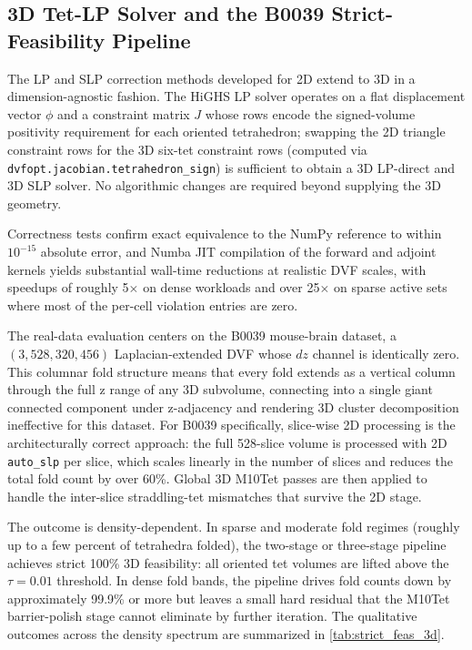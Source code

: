 \subsection{3D Tet-LP Solver and the B0039 Strict-Feasibility Pipeline}
\label{sec:3d_solver}

The LP and SLP correction methods developed for 2D extend to 3D in a dimension-agnostic fashion. The HiGHS LP solver operates on a flat displacement vector $\phi$ and a constraint matrix $J$ whose rows encode the signed-volume positivity requirement for each oriented tetrahedron; swapping the 2D triangle constraint rows for the 3D six-tet constraint rows (computed via \texttt{dvfopt.jacobian.tetrahedron\_sign}) is sufficient to obtain a 3D LP-direct and 3D SLP solver. No algorithmic changes are required beyond supplying the 3D geometry.

Correctness tests confirm exact equivalence to the NumPy reference to within $10^{-15}$ absolute error, and Numba JIT compilation of the forward and adjoint kernels yields substantial wall-time reductions at realistic DVF scales, with speedups of roughly 5$\times$ on dense workloads and over 25$\times$ on sparse active sets where most of the per-cell violation entries are zero.

The real-data evaluation centers on the B0039 mouse-brain dataset, a $(3, 528, 320, 456)$ Laplacian-extended DVF whose $dz$ channel is identically zero. This columnar fold structure means that every fold extends as a vertical column through the full z range of any 3D subvolume, connecting into a single giant connected component under z-adjacency and rendering 3D cluster decomposition ineffective for this dataset. For B0039 specifically, slice-wise 2D processing is the architecturally correct approach: the full 528-slice volume is processed with 2D \texttt{auto\_slp} per slice, which scales linearly in the number of slices and reduces the total fold count by over 60\%. Global 3D M10Tet passes are then applied to handle the inter-slice straddling-tet mismatches that survive the 2D stage.

The outcome is density-dependent. In sparse and moderate fold regimes (roughly up to a few percent of tetrahedra folded), the two-stage or three-stage pipeline achieves strict 100\% 3D feasibility: all oriented tet volumes are lifted above the $\tau = 0.01$ threshold. In dense fold bands, the pipeline drives fold counts down by approximately 99.9\% or more but leaves a small hard residual that the M10Tet barrier-polish stage cannot eliminate by further iteration. The qualitative outcomes across the density spectrum are summarized in \autoref{tab:strict_feas_3d}.

